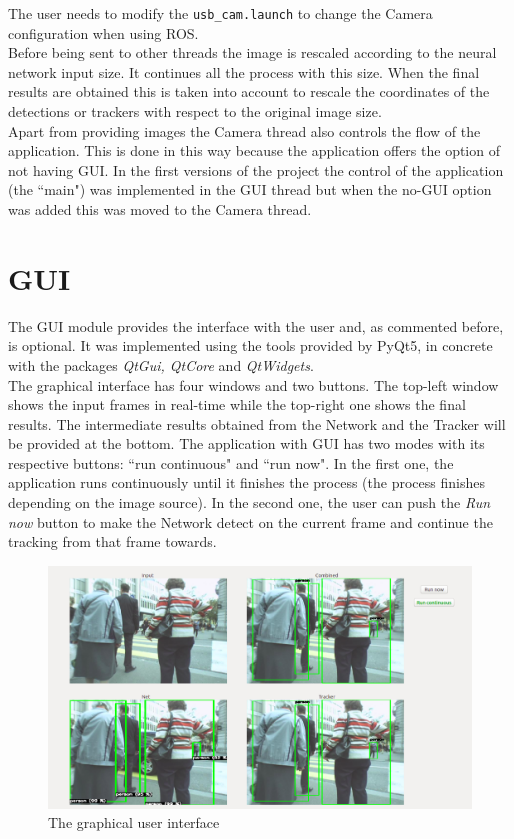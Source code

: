 The user needs to modify the \texttt{usb\_cam.launch} to change the Camera configuration when using ROS.\\
Before being sent to other threads the image is rescaled according to the neural network input size. It continues all the process with this size. When the final results are obtained this is taken into account to rescale the coordinates of the detections or trackers with respect to the original image size.\\
Apart from providing images the Camera thread also controls the flow of the application. This is done in this way because the application offers the option of not having GUI. In the first versions of the project the control of the application (the ``main") was implemented in the GUI thread but when the no-GUI option was added this was moved to the Camera thread.\\

\section{GUI}
The GUI module provides the interface with the user and, as commented before, is optional. It was implemented using the tools provided by PyQt5, in concrete with the packages \textit{QtGui, QtCore} and \textit{QtWidgets}.\\
The graphical interface has four windows and two buttons. The top-left window shows the input frames in real-time while the top-right one shows the final results. The intermediate results obtained from the Network and the Tracker will be provided at the bottom. The application with GUI has two modes with its respective buttons: ``run continuous" and ``run now". In the first one, the application runs continuously until it finishes the process (the process finishes depending on the image source). In the second one, the user can push the \textit{Run now} button to make the Network detect on the current frame and continue the tracking from that frame towards.
\begin{figure}[H]
\begin{center}
\includegraphics[scale=0.3]{figures/gui.png}
\caption{The graphical user interface}
\label{fig:gui}
\end{center}
\end{figure} 
